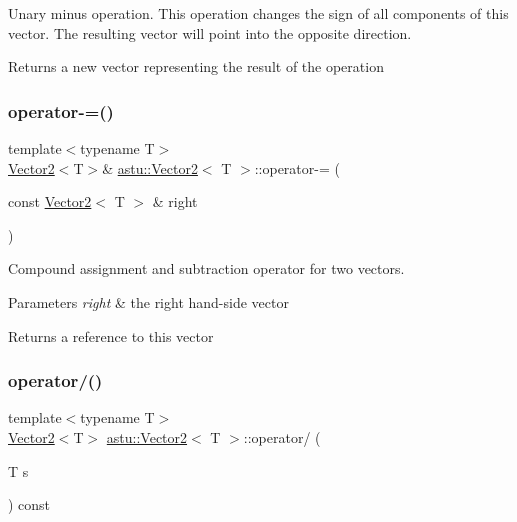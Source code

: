 Unary minus operation. This operation changes the sign of all components of this vector. The resulting vector will point into the opposite direction.

\begin{DoxyReturn}{Returns}
a new vector representing the result of the operation 
\end{DoxyReturn}
\mbox{\label{classastu_1_1Vector2_a7022d1b830ee06d272a05d7d52c93a53}} 
\subsubsection{\texorpdfstring{operator-\/=()}{operator-=()}}
{\footnotesize\ttfamily template$<$typename T$>$ \\
\hyperlink{classastu_1_1Vector2}{Vector2}$<$T$>$\& \hyperlink{classastu_1_1Vector2}{astu\+::\+Vector2}$<$ T $>$\+::operator-\/= (\begin{DoxyParamCaption}\item[{const \hyperlink{classastu_1_1Vector2}{Vector2}$<$ T $>$ \&}]{right }\end{DoxyParamCaption})\hspace{0.3cm}{\ttfamily [inline]}}

Compound assignment and subtraction operator for two vectors.


\begin{DoxyParams}{Parameters}
{\em right} & the right hand-\/side vector \\
\hline
\end{DoxyParams}
\begin{DoxyReturn}{Returns}
a reference to this vector 
\end{DoxyReturn}
\mbox{\label{classastu_1_1Vector2_af2852a5bb5295f1a510e507bc554863d}} 
\subsubsection{\texorpdfstring{operator/()}{operator/()}}
{\footnotesize\ttfamily template$<$typename T$>$ \\
\hyperlink{classastu_1_1Vector2}{Vector2}$<$T$>$ \hyperlink{classastu_1_1Vector2}{astu\+::\+Vector2}$<$ T $>$\+::operator/ (\begin{DoxyParamCaption}\item[{T}]{s }\end{DoxyParamCaption}) const\hspace{0.3cm}{\ttfamily [inline]}}

